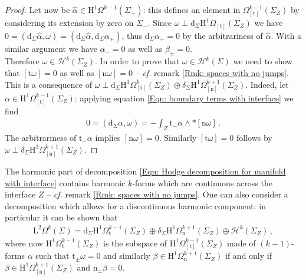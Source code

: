 \begin{proof}
	Let now be $\hat{\alpha}\in\mathrm{H}^1\Omega^{k-1}(\Sigma_+)$: this defines an element in $\Omega^{k-1}_{[\mathrm{t}]}(\Sigma_Z)$ by considering its extension by zero on $\Sigma_-$.
	Since $\omega\perp\mathrm{d}_\Sigma\mathrm{H}^1\Omega_{[\mathrm{t}]}(\Sigma_Z)$ we have $0=(\mathrm{d}_\Sigma\hat{\alpha},\omega)=(\mathrm{d}_\Sigma\hat{\alpha},\mathrm{d}_\Sigma\alpha_+)$, thus $\mathrm{d}_\Sigma\alpha_+=0$ by the arbitrariness of $\hat{\alpha}$.
	With a similar argument we have $\alpha_-=0$ as well as $\beta_\pm=0$.
	\\
	Therefore $\omega\in\mathcal{H}^k(\Sigma_Z)$.
	In order to prove that $\omega\in\mathcal{H}^k(\Sigma)$ we need to show that $[\mathrm{t}\omega]=0$ as well as $[\mathrm{n}\omega]=0$ -- \textit{cf.} remark \ref{Rmk: spaces with no jumps}.
	This is a consequence of $\omega\perp\mathrm{d}_\Sigma \mathrm{H}^1\Omega^k_{[\mathrm{t}]}(\Sigma_Z)\oplus\delta_\Sigma \mathrm{H}^1\Omega^{k+1}_{[\mathrm{n}]}(\Sigma_Z)$.
	Indeed, let $\alpha\in\mathrm{H}^1\Omega^{k-1}_{[\mathrm{t}]}(\Sigma_Z)$: applying equation \eqref{Eqn: boundary terms with interface} we find
	\begin{align}
		0=(\mathrm{d}_\Sigma\alpha,\omega)=-\int_Z\mathrm{t}_-\overline{\alpha}\wedge\ast[\mathrm{n}\omega]\,.
	\end{align}
	The arbitrariness of $\mathrm{t}_-\alpha$ implies $[\mathrm{n}\omega]=0$.
	Similarly $[\mathrm{t}\omega]=0$ follows by $\omega\perp\delta_\Sigma\mathrm{H}^1\Omega^{k+1}_{[\mathrm{n}]}(\Sigma_Z)$.
\end{proof}
\begin{remark}
	The harmonic part of decomposition \eqref{Eqn: Hodge decomposition for manifold with interface} contains harmonic $k$-forms which are continuous across the interface $Z$ -- \textit{cf.} remark \ref{Rmk: spaces with no jumps}.
	One can also consider a decomposition which allows for a discontinuous harmonic component: in particular it can be shown that
	\begin{align*}
		\mathrm{L}^2\Omega^k(\Sigma)=
		\mathrm{d}_\Sigma\mathrm{H}^1\Omega^{k-1}_{\mathrm{t}}(\Sigma_Z)\oplus
		\delta_\Sigma\mathrm{H}^1\Omega^{k+1}_{\mathrm{n}}(\Sigma_Z)\oplus
		\mathcal{H}^k(\Sigma_Z)\,,
	\end{align*}
	where now $\mathrm{H}^1\Omega^{k-1}_{\mathrm{t}}(\Sigma_Z)$ is the subspace of $\mathrm{H}^1\Omega^{k-1}_{[\mathrm{t}]}(\Sigma_Z)$ made of $(k-1)$-forms $\alpha$ such that $\mathrm{t}_\pm\omega=0$ and similarly $\beta\in\mathrm{H}^1\Omega^{k+1}_{\mathrm{n}}(\Sigma_Z)$ if and only if $\beta\in\mathrm{H}^1\Omega^{k+1}_{[\mathrm{n}]}(\Sigma_Z)$ and $\mathrm{n}_\pm\beta=0$.
\end{remark}
